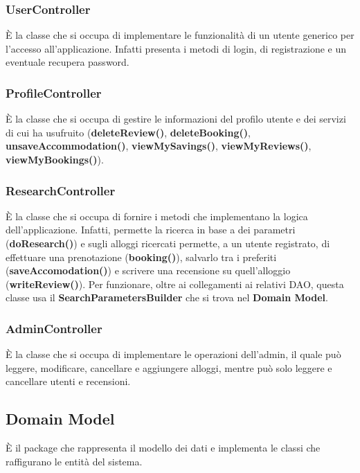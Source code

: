 \documentclass[10pt]{article}
\begin{document}
\subsubsection{UserController}

\`E la classe che si occupa di implementare le funzionalità di un utente generico per l'accesso all'applicazione. Infatti presenta i metodi di login, di registrazione e un eventuale recupera password.

\subsubsection{ProfileController}

\`E la classe che si occupa di gestire le informazioni del profilo utente e dei servizi di cui ha usufruito (\textbf{deleteReview()}, \textbf{deleteBooking()}, \textbf{unsaveAccommodation()}, \textbf{viewMySavings()}, \textbf{viewMyReviews()}, \textbf{viewMyBookings()}).

\subsubsection{ResearchController}

\`E la classe che si occupa di fornire i metodi che implementano la logica dell'applicazione. Infatti, permette la ricerca in base a dei parametri (\textbf{doResearch()}) e sugli alloggi ricercati permette, a un utente registrato, di effettuare una prenotazione (\textbf{booking()}), salvarlo tra i preferiti (\textbf{saveAccomodation()}) e scrivere una recensione su quell'alloggio (\textbf{writeReview()}). Per funzionare, oltre ai collegamenti ai relativi DAO, questa classe usa il \textbf{SearchParametersBuilder} che si trova nel \textbf{Domain Model}.

\subsubsection{AdminController}

\`E la classe che si occupa di implementare le operazioni dell'admin, il quale può  leggere, modificare, cancellare e aggiungere alloggi, mentre può solo leggere e cancellare utenti e recensioni.
 
\subsection{Domain Model}

\`E il package che rappresenta il modello dei dati e implementa le classi che raffigurano le entità del sistema.
\end{document}
